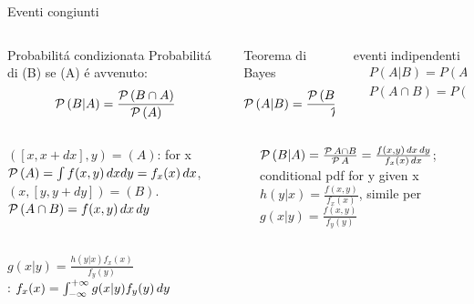 \documentclass[asd-beamer.tex]{subfiles}%
\begin{document}
\begin{frame}{Eventi congiunti}
\begin{columns}[T]
\begin{column}{0.3\textwidth}
\begin{block}{Probabilit\'a condizionata}
Probabilit\'a di (B) se (A) \'e avvenuto:
\[\operatorname{\mathcal{P}}{(B|A)}=\frac{\operatorname{\mathcal{P}}{(B\cap A)}}{\operatorname{\mathcal{P}}{(A)}}\]
\end{block}
\end{column}
\begin{column}{0.4\textwidth}
\begin{block}{Teorema di Bayes}
\[\operatorname{\mathcal{P}}{(A|B)}=\frac{\operatorname{\mathcal{P}}{(B|A)}\operatorname{\mathcal{P}}{(A)}}{\operatorname{\mathcal{P}}{(B)}}\]
\end{block}
\end{column}
\begin{column}{0.25\textwidth}
\begin{block}{eventi indipendenti}
\begin{align*}
&P(A|B)=P(A)\\
&P(A\cap B)=P(A)P(B)
\end{align*}		
\end{block}
\end{column}
\end{columns}
\begin{columns}[T]\begin{column}{0.5\textwidth}
\begin{block}{}
$([x,x+dx],y)=(A)$:  for x $\operatorname{\mathcal{P}}{(A)}=\int f(x,y)\,dxdy=f_x(x)\,dx$, $(x,[y,y+dy])=(B)$. $\operatorname{\mathcal{P}}{(A\cap B)}=f(x,y)\,dx\,dy$
\end{block}
\end{column} \begin{column}{0.5\textwidth}
\begin{block}{}
$\operatorname{\mathcal{P}}{(B|A)}=\frac{\operatorname{\mathcal{P}}{A\cap B}}{\operatorname{\mathcal{P}}{A}}=\frac{f(x,y)\,dx\,dy}{f_x(x)\,dx}$; conditional pdf for y given x $h(y|x)=\frac{f(x,y)}{f_x(x)}$, simile per $g(x|y)=\frac{f(x,y)}{f_y(y)}$
\end{block}
\end{column}\end{columns}
 $g(x|y)=\frac{h(y|x)f_x(x)}{f_y(y)}$\\
: $f_x(x)=\int_{-\infty}^{+\infty}{}g(x|y)f_y(y)\,dy$
\end{frame}
\end{document}
